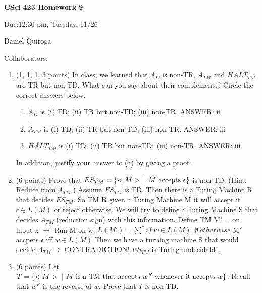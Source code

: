 \documentclass[11pt]{article}
\begin{document}
\begin{LARGE}
\centerline {\bf CSci 423 Homework 9}
\end{LARGE}
\vskip 0.25cm

\centerline {Due:12:30 pm, Tuesday, 11/26}
\centerline{Daniel Quiroga}

Collaborators:

\begin{enumerate}

\item (1, 1, 1, 3 points) In class, we learned that $A_D$ is non-TR, $A_{TM}$ and $HALT_{TM}$ are TR but non-TD. What can you say about their complements? Circle the correct answers below.
\begin{enumerate}
\item ${\overline A_D}$ is \qquad (i) TD; \qquad (ii) TR but non-TD; \qquad (iii) non-TR. ANSWER: ii
\item ${\overline A_{TM}}$ is \qquad (i) TD; \qquad (ii) TR but non-TD; \qquad (iii) non-TR. ANSWER: iii
\item ${\overline {HALT}_{TM}}$ is \qquad (i) TD; \qquad (ii) TR but non-TD; \qquad (iii) non-TR. ANSWER: iii
\end{enumerate}

In addition, justify your answer to (a) by giving a proof.


\item (6 points) Prove that $ES_{TM}=\{<M>\ |\ M{\rm\ accepts\ }\epsilon\}$ is non-TD. (Hint: Reduce from $A_{TM}$.) \newline 
Assume $ES_{TM}$ is TD. Then there is a Turing Machine R that decides $ES_{TM}$. \newline So TM R given a Turing Machine M it will accept if $\epsilon \in L(M)$ or reject otherwise. We will try to define a Turing Machine S that decides $A_{TM}$ (reduction sign)  with this information. \newline 
Define TM M' = on input x $\rightarrow$ Run M on w. \newline 
$L(M') = \sum^* if\  w \in L(M) | \  \emptyset\ otherwise $ \newline 
M' accpets $\epsilon$ iff $w \in L(M)$ \newline Then we have a turning machine S that would decide  $A_{TM} \rightarrow$ CONTRADICTION! \newline 
$ES_{TM}$ is Turing-undecidable. 

\item (6 points) Let $T=\{<M>\ |\ M{\rm\ is\ a\ TM\ that\ accepts\ }w^R{\rm\ whenever\ it\ accepts\ }w\}$. 
Recall that $w^R$ is the reverse of $w$. Prove that $T$ is non-TD. 


\end{enumerate}
\end{document}
